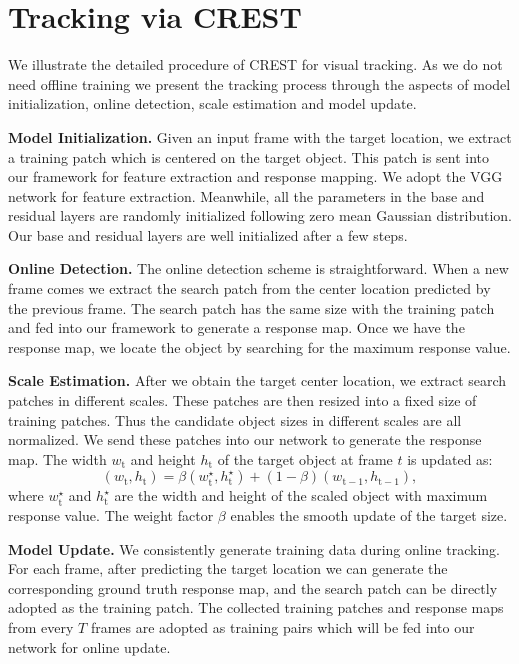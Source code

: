 \documentclass[10pt,twocolumn,letterpaper]{article}
\begin{document}
\section{Tracking via CREST}
We illustrate the detailed procedure of CREST for visual tracking.
%
As we do not need offline training we present the tracking process through the aspects of model initialization, online detection, scale estimation and model update.

{\flushleft \bf Model Initialization.}
Given an input frame with the target location, we extract a training patch which is centered on the target object. This patch is sent into our framework for feature extraction and response mapping. We adopt the VGG network \cite{simonyan-iclr14-very} for feature extraction. Meanwhile, all the parameters in the base and residual layers are randomly initialized following zero mean Gaussian distribution. Our base and residual layers are well initialized after a few steps.

{\flushleft \bf Online Detection.}
The online detection scheme is straightforward. When a new frame comes we extract the search patch from the center location predicted by the previous frame. The search patch has the same size with the training patch and fed into our framework to generate a response map. Once we have the response map, we locate the object by searching for the maximum response value.

{\flushleft \bf Scale Estimation.}
After we obtain the target center location, we extract search patches in different scales. These patches are then resized into a fixed size of training patches.
%
Thus the candidate object sizes in different scales are all normalized. We send these patches into our network to generate the response map. The width $w_\textrm{t}$ and height $h_\textrm{t}$ of the target object at frame $t$ is updated as:
\begin{equation}
(w_\textrm{t},h_\textrm{t})=\beta(w_\textrm{t}^\star,h_\textrm{t}^\star)+(1-\beta)(w_{\textrm{t}-1},h_{\textrm{t}-1}),
\label{eq:scale}
\end{equation}
where $w_\textrm{t}^\star$ and $h_\textrm{t}^\star$ are the width and height of the scaled object with maximum response value. The weight factor $\beta$ enables the smooth update of the target size.

{\flushleft \bf Model Update.}
We consistently generate training data during online tracking. For each frame, after predicting the target location we can generate the corresponding ground truth response map, and the search patch can be directly adopted as the training patch. The collected training patches and response maps from every $T$ frames are adopted as training pairs which will be fed into our network for online update.
\end{document}
